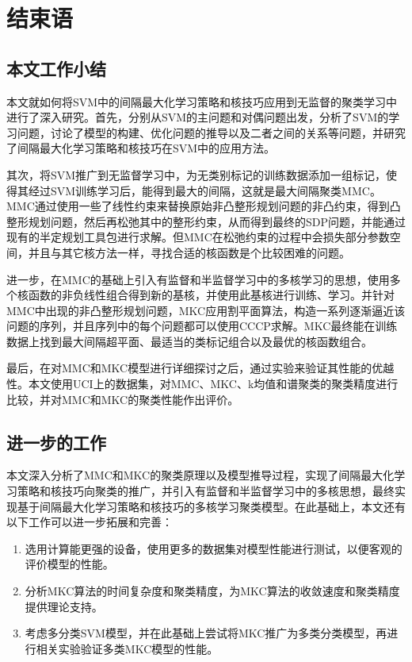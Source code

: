 \chapter{结束语}
\section{本文工作小结}
本文就如何将SVM中的间隔最大化学习策略和核技巧应用到无监督的聚类学习中进行了深入研究。首先，分别从SVM的主问题和对偶问题出发，分析了SVM的学习问题，讨论了模型的构建、优化问题的推导以及二者之间的关系等问题，并研究了间隔最大化学习策略和核技巧在SVM中的应用方法。

其次，将SVM推广到无监督学习中，为无类别标记的训练数据添加一组标记，使得其经过SVM训练学习后，能得到最大的间隔，这就是最大间隔聚类MMC。MMC通过使用一些了线性约束来替换原始非凸整形规划问题的非凸约束，得到凸整形规划问题，然后再松弛其中的整形约束，从而得到最终的SDP问题，并能通过现有的半定规划工具包进行求解。但MMC在松弛约束的过程中会损失部分参数空间，并且与其它核方法一样，寻找合适的核函数是个比较困难的问题。

进一步，在MMC的基础上引入有监督和半监督学习中的多核学习的思想，使用多个核函数的非负线性组合得到新的基核，并使用此基核进行训练、学习。并针对MMC中出现的非凸整形规划问题，MKC应用割平面算法，构造一系列逐渐逼近该问题的序列，并且序列中的每个问题都可以使用CCCP求解。MKC最终能在训练数据上找到最大间隔超平面、最适当的类标记组合以及最优的核函数组合。

最后，在对MMC和MKC模型进行详细探讨之后，通过实验来验证其性能的优越性。本文使用UCI上的数据集，对MMC、MKC、k均值和谱聚类的聚类精度进行比较，并对MMC和MKC的聚类性能作出评价。

\section{进一步的工作}
本文深入分析了MMC和MKC的聚类原理以及模型推导过程，实现了间隔最大化学习策略和核技巧向聚类的推广，并引入有监督和半监督学习中的多核思想，最终实现基于间隔最大化学习策略和核技巧的多核学习聚类模型。在此基础上，本文还有以下工作可以进一步拓展和完善：
\begin{enumerate}[fullwidth,itemindent=24pt]
  \item 选用计算能更强的设备，使用更多的数据集对模型性能进行测试，以便客观的评价模型的性能。
  \item 分析MKC算法的时间复杂度和聚类精度，为MKC算法的收敛速度和聚类精度提供理论支持。
  \item 考虑多分类SVM模型，并在此基础上尝试将MKC推广为多类分类模型，再进行相关实验验证多类MKC模型的性能。
\end{enumerate}
